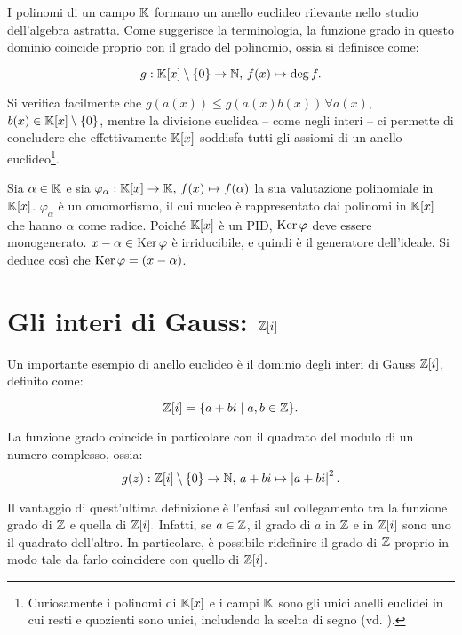 \documentclass[11pt]{scrbook}
\begin{document}
I polinomi di un campo $\mathbb{K}$ formano un anello euclideo rilevante
nello studio dell'algebra astratta. Come suggerisce la
terminologia, la funzione grado in questo dominio coincide
proprio con il grado del polinomio, ossia si definisce come:

\[g : \mathbb{K}[x] \setminus \{0\} \to \mathbb N, \, f(x) \mapsto \deg f.\]

\vskip 0.1in

Si verifica facilmente che $g(a(x)) \leq g(a(x)b(x)) \, \forall a(x)$, $b(x) \in \mathbb{K}[x] \setminus \{0\}$, mentre la divisione euclidea -- come negli interi -- ci permette
di concludere che effettivamente $\mathbb{K}[x]$ soddisfa tutti gli assiomi di un anello
euclideo\footnote{Curiosamente i polinomi di $\mathbb{K}[x]$ e i campi $\mathbb{K}$ sono gli unici anelli euclidei in cui resti
    e quozienti sono unici, includendo la scelta di segno (vd.
    \cite{10.2307/2315810}).}.

\begin{example}
    Sia $\alpha \in \mathbb{K}$ e sia $\varphi_\alpha : \mathbb{K}[x] \to \mathbb{K}, \, f(x) \mapsto f(\alpha)$
    la sua valutazione polinomiale in $\mathbb{K}[x]$. $\varphi_\alpha$ è un omomorfismo, il cui
    nucleo è rappresentato dai polinomi in $\mathbb{K}[x]$ che hanno $\alpha$ come radice. Poiché
    $\mathbb{K}[x]$ è un PID, $\operatorname{Ker} \varphi$ deve essere monogenerato. $x-\alpha \in \operatorname{Ker} \varphi$
    è irriducibile, e quindi è il generatore dell'ideale. Si deduce così che
    $\operatorname{Ker} \varphi = (x-\alpha)$.
\end{example}

\section{Gli interi di Gauss: \texorpdfstring{$\mathbb Z[i]$}{Z[i]}}

Un importante esempio di anello euclideo è il dominio degli interi di Gauss $\mathbb Z[i]$, definito come:

\[\mathbb Z[i] = \{a+bi \mid a, b \in \mathbb Z\}.\]

\vskip 0.1in

La funzione grado coincide in particolare con il quadrato del modulo di un numero complesso, ossia:
\[g(z) : \mathbb Z[i] \setminus \{0\} \to \mathbb N, \, a+bi \mapsto \left| a+bi \right|^2.\]

Il vantaggio di quest'ultima definizione è l'enfasi sul collegamento tra la funzione grado
di $\mathbb Z$ e quella di $\mathbb Z[i].$ Infatti, se $a \in \mathbb Z$, il grado di $a$ in $\mathbb Z$ e in $\mathbb Z[i]$
sono uno il quadrato dell'altro. In particolare, è possibile ridefinire il grado
di $\mathbb Z$ proprio in modo tale da farlo coincidere con quello di $\mathbb Z[i]$. \\
\end{document}
